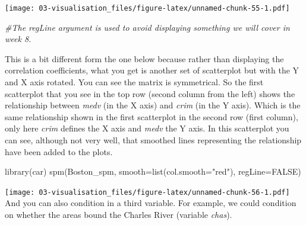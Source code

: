 \documentclass[
]{book}
\newenvironment{Shaded}{\begin{snugshade}}{\end{snugshade}}
\newcommand{\AttributeTok}[1]{\textcolor[rgb]{0.77,0.63,0.00}{#1}}
\newcommand{\CommentTok}[1]{\textcolor[rgb]{0.56,0.35,0.01}{\textit{#1}}}
\newcommand{\ConstantTok}[1]{\textcolor[rgb]{0.00,0.00,0.00}{#1}}
\newcommand{\FunctionTok}[1]{\textcolor[rgb]{0.00,0.00,0.00}{#1}}
\newcommand{\NormalTok}[1]{#1}
\newcommand{\OtherTok}[1]{\textcolor[rgb]{0.56,0.35,0.01}{#1}}
\newcommand{\SpecialCharTok}[1]{\textcolor[rgb]{0.00,0.00,0.00}{#1}}
\newcommand{\StringTok}[1]{\textcolor[rgb]{0.31,0.60,0.02}{#1}}
\begin{document}
\texttt{[image: 03-visualisation\_files/figure-latex/unnamed-chunk-55-1.pdf]}

\begin{Shaded}
\begin{Highlighting}[]
\CommentTok{\#The regLine argument is used to avoid displaying something we will cover in week 8.}
\end{Highlighting}
\end{Shaded}

This is a bit different form the one below because rather than displaying the correlation coefficients, what you get is another set of scatterplot but with the Y and X axis rotated. You can see the matrix is symmetrical. So the first scatterplot that you see in the top row (second column from the left) shows the relationship between \emph{medv} (in the X axis) and \emph{crim} (in the Y axis). Which is the same relationship shown in the first scatterplot in the second row (first column), only here \emph{crim} defines the X axis and \emph{medv} the Y axis. In this scatterplot you can see, although not very well, that smoothed lines representing the relationship have been added to the plots.

\begin{Shaded}
\begin{Highlighting}[]
\FunctionTok{library}\NormalTok{(car)}
\FunctionTok{spm}\NormalTok{(Boston\_spm, }\AttributeTok{smooth=}\FunctionTok{list}\NormalTok{(}\AttributeTok{col.smooth=}\StringTok{"red"}\NormalTok{), }\AttributeTok{regLine=}\ConstantTok{FALSE}\NormalTok{)}
\end{Highlighting}
\end{Shaded}

\texttt{[image: 03-visualisation\_files/figure-latex/unnamed-chunk-56-1.pdf]}
And you can also condition in a third variable. For example, we could condition on whether the areas bound the Charles River (variable \emph{chas}).

\begin{Shaded}
\end{Shaded}
\end{document}
